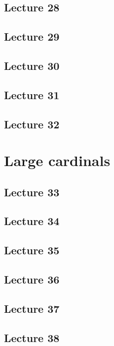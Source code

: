 \documentclass[10pt,letterpaper,cm]{nupset}
\theoremstyle{definition}
\theoremstyle{theorem}
\theoremstyle{remark}
\newcommand{\1}{\mathbf{1}}
\newcommand{\0}{\vec 0}
\begin{document}
\subsection{Lecture 28}

\subsection{Lecture 29}

\subsection{Lecture 30}

\subsection{Lecture 31}

\subsection{Lecture 32}

\section{Large cardinals}

\subsection{Lecture 33}

\subsection{Lecture 34}

\subsection{Lecture 35}

\subsection{Lecture 36}

\subsection{Lecture 37}

\subsection{Lecture 38}
\end{document}
